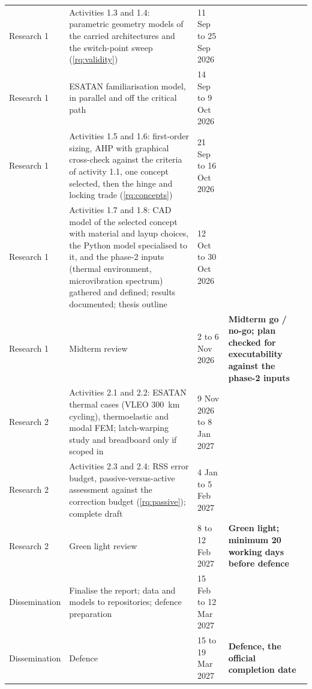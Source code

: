 {\begin{longtable}{p{1.9cm}p{6.0cm}p{2.5cm}p{3.4cm}}
        Research 1 & Activities 1.3 and 1.4: parametric geometry models of the carried architectures and the switch-point sweep (\cref{rq:validity}) & 11 Sep to 25 Sep 2026 & \\
        \addlinespace
        
        Research 1 & ESATAN familiarisation model, in parallel and off the critical path & 14 Sep to 9 Oct 2026 & \\
        \addlinespace
        
        Research 1 & Activities 1.5 and 1.6: first-order sizing, AHP with graphical cross-check against the criteria of activity 1.1, one concept selected, then the hinge and locking trade (\cref{rq:concepts}) & 21 Sep to 16 Oct 2026 & \\
        \addlinespace
        
        Research 1 & Activities 1.7 and 1.8: CAD model of the selected concept with material and layup choices, the Python model specialised to it, and the phase-2 inputs (thermal environment, microvibration spectrum) gathered and defined; results documented; thesis outline & 12 Oct to 30 Oct 2026 & \\
        \addlinespace
        
        Research 1 & Midterm review & 2 to 6 Nov 2026 & \textbf{Midterm go / no-go; plan checked for executability against the phase-2 inputs} \\
        \addlinespace
        
        Research 2 & Activities 2.1 and 2.2: ESATAN thermal cases (VLEO \SI{300}{\kilo\meter} cycling), thermoelastic and modal FEM; latch-warping study and breadboard only if scoped in & 9 Nov 2026 to 8 Jan 2027 & \\
        \addlinespace
        
        Research 2 & Activities 2.3 and 2.4: RSS error budget, passive-versus-active assessment against the correction budget (\cref{rq:passive}); complete draft & 4 Jan to 5 Feb 2027 & \\
        \addlinespace
        
        Research 2 & Green light review & 8 to 12 Feb 2027 & \textbf{Green light; minimum 20 working days before defence} \\
        \addlinespace
        
        Dissemination & Finalise the report; data and models to repositories; defence preparation & 15 Feb to 12 Mar 2027 & \\
        \addlinespace
        
        Dissemination & Defence & 15 to 19 Mar 2027 & \textbf{Defence, the official completion date} \\
        
        \bottomrule
\end{longtable}
}


